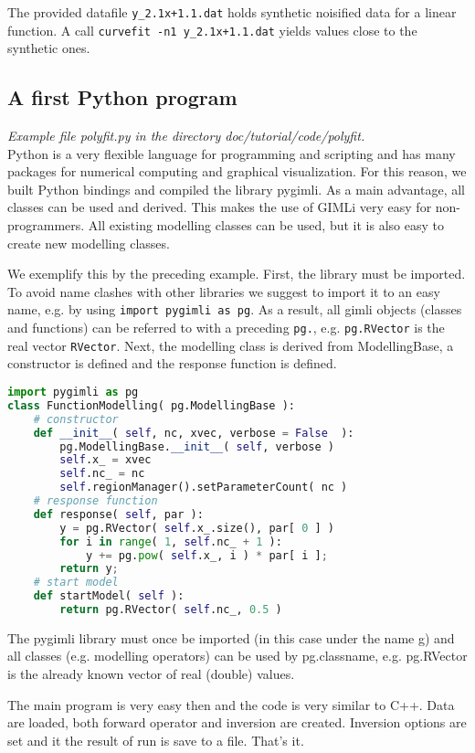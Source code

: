 The provided datafile \verb|y_2.1x+1.1.dat| holds synthetic noisified data for a linear function.
A call \verb|curvefit -n1 y_2.1x+1.1.dat| yields values close to the synthetic ones.

\subsection{A first Python program}
{\em Example file polyfit.py in the directory doc/tutorial/code/polyfit.}\\
Python is a very flexible language for programming and scripting and has many packages for numerical computing and graphical visualization.
For this reason, we built Python bindings and compiled the library pygimli.
As a main advantage, all classes can be used and derived.
This makes the use of GIMLi very easy for non-programmers.
All existing modelling classes can be used, but it is also easy to create new modelling classes.

We exemplify this by the preceding example.
First, the library must be imported.
To avoid name clashes with other libraries we suggest to import it to an easy name, e.g. by using \lstinline|import pygimli as pg|.
As a result, all gimli objects (classes and functions) can be referred to with a preceding \lstinline|pg.|, e.g. \lstinline|pg.RVector| is the real vector \lstinline|RVector|.
Next, the modelling class is derived from ModellingBase, a constructor is defined and the response function is defined.
\begin{lstlisting}[language=python]
import pygimli as pg
class FunctionModelling( pg.ModellingBase ):
    # constructor
    def __init__( self, nc, xvec, verbose = False  ):
        pg.ModellingBase.__init__( self, verbose )
        self.x_ = xvec
        self.nc_ = nc
        self.regionManager().setParameterCount( nc )
    # response function
    def response( self, par ):
        y = pg.RVector( self.x_.size(), par[ 0 ] )
        for i in range( 1, self.nc_ + 1 ):
            y += pg.pow( self.x_, i ) * par[ i ];
        return y;
    # start model
    def startModel( self ):
        return pg.RVector( self.nc_, 0.5 )
\end{lstlisting}

The pygimli library must once be imported (in this case under the name g) and all classes (e.g. modelling operators) can be used by pg.classname, e.g. pg.RVector is the already known vector of real (double) values.

The main program is very easy then and the code is very similar to C++.
Data are loaded, both forward operator and inversion are created.
Inversion options are set and it the result of run is save to a file.
That's it.

